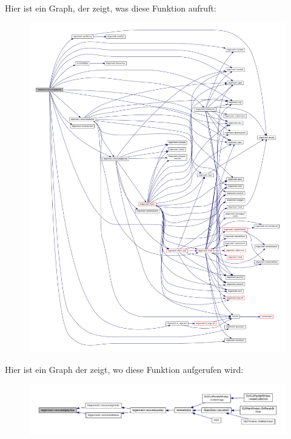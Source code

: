 Hier ist ein Graph, der zeigt, was diese Funktion aufruft\-:
\nopagebreak
\begin{figure}[H]
\begin{center}
\leavevmode
\includegraphics[width=350pt]{classtetgenmesh_a558494ab92a7012fae3cfe96bb33f8e9_cgraph}
\end{center}
\end{figure}




Hier ist ein Graph der zeigt, wo diese Funktion aufgerufen wird\-:
\nopagebreak
\begin{figure}[H]
\begin{center}
\leavevmode
\includegraphics[width=350pt]{classtetgenmesh_a558494ab92a7012fae3cfe96bb33f8e9_icgraph}
\end{center}
\end{figure}


